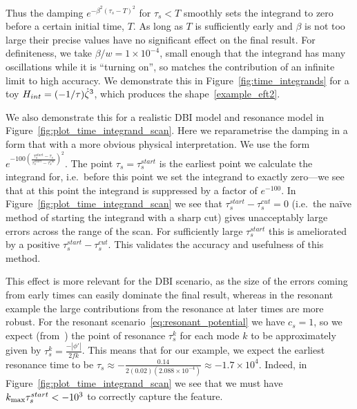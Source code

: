 Thus the damping $e^{-\beta^2{(\tau_s-T)}^2}$ for $\tau_s<T$ smoothly
sets the integrand to zero before a certain initial time, $T$.
As long as $T$ is sufficiently early and $\beta$ is not too large
their precise values have no significant effect on the final result.
For definiteness, we take $\beta/w=1\times10^{-4}$, small enough that
the integrand has many oscillations while it is ``turning on'',
so matches the contribution of an infinite limit to high accuracy.
We demonstrate this in Figure~\ref{fig:time_integrands}
for a toy $H_{int}=(-1/\tau)\dot{\zeta}^3$,
which produces the shape~\eqref{example_eft2}.


We also demonstrate this for a realistic DBI model and resonance model
in Figure~\ref{fig:plot_time_integrand_scan}.
Here we reparametrise the damping in a form that with a more obvious physical
interpretation.
We use the form $e^{-100{\left(\frac{{\tau_s^{start}-\tau_s}}{\tau_s^{start}-\tau_s^{cut}}\right)}^2}$.
The point $\tau_s=\tau_s^{start}$ is the earliest point we calculate the integrand for,
i.e.\ before this point we set the integrand to exactly zero---we
see that at this point the integrand is suppressed by a factor of $e^{-100}$.
In Figure~\ref{fig:plot_time_integrand_scan} we see that $\tau_s^{start}-\tau_s^{cut}=0$
(i.e.\ the na\"{i}ve method of starting the integrand with a sharp cut)
gives unacceptably large errors across the range of the scan. For sufficiently large
$\tau_s^{start}$ this is ameliorated by a positive $\tau_s^{start}-\tau_s^{cut}$.
This validates the accuracy and usefulness of this method.


This effect is more relevant for the DBI scenario, as the size of the errors coming
from early times can easily dominate the final result, whereas in the resonant example
the large contributions from the resonance at later times are more robust.
For the resonant scenario~\eqref{eq:resonant_potential} we have $c_s=1$,
so we expect (from~\cite{flauger_pajer_resonant}) the point of resonance $\tau^k_s$
for each mode $k$ to be approximately given by $\tau^k_s = \frac{-\left|\phi'\right|}{2fk}$.
This means that for our example, we expect the earliest resonance time to be
$\tau_s\approx-\frac{0.14}{2(0.02)(2.088\times10^{-4})}\approx-1.7\times10^{4}$.
Indeed, in Figure~\ref{fig:plot_time_integrand_scan} we see that
we must have ${k_\text{max}}\tau_s^{start}<-10^3$
to correctly capture the feature.


